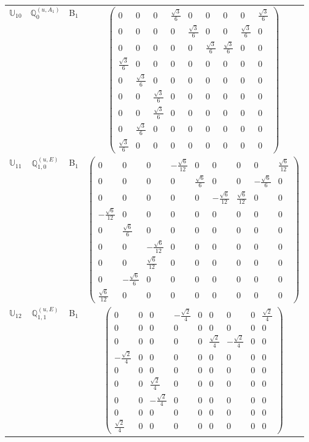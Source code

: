 \documentclass[fleqn,10pt,landscape]{article}
\begin{document}
\begin{itemize}
\begin{center}
\begin{longtable}{c|c|c|c}
$ \mathbb{U}_{10} $ & $\mathbb{Q}_{0}^{(u,A_{1})}$ & B$_{1}$ & $\begin{pmatrix} 0 & 0 & 0 & \frac{\sqrt{3}}{6} & 0 & 0 & 0 & 0 & \frac{\sqrt{3}}{6} \\ 0 & 0 & 0 & 0 & \frac{\sqrt{3}}{6} & 0 & 0 & \frac{\sqrt{3}}{6} & 0 \\ 0 & 0 & 0 & 0 & 0 & \frac{\sqrt{3}}{6} & \frac{\sqrt{3}}{6} & 0 & 0 \\ \frac{\sqrt{3}}{6} & 0 & 0 & 0 & 0 & 0 & 0 & 0 & 0 \\ 0 & \frac{\sqrt{3}}{6} & 0 & 0 & 0 & 0 & 0 & 0 & 0 \\ 0 & 0 & \frac{\sqrt{3}}{6} & 0 & 0 & 0 & 0 & 0 & 0 \\ 0 & 0 & \frac{\sqrt{3}}{6} & 0 & 0 & 0 & 0 & 0 & 0 \\ 0 & \frac{\sqrt{3}}{6} & 0 & 0 & 0 & 0 & 0 & 0 & 0 \\ \frac{\sqrt{3}}{6} & 0 & 0 & 0 & 0 & 0 & 0 & 0 & 0 \end{pmatrix}$ \\
$ \mathbb{U}_{11} $ & $\mathbb{Q}_{1,0}^{(u,E)}$ & B$_{1}$ & $\begin{pmatrix} 0 & 0 & 0 & - \frac{\sqrt{6}}{12} & 0 & 0 & 0 & 0 & \frac{\sqrt{6}}{12} \\ 0 & 0 & 0 & 0 & \frac{\sqrt{6}}{6} & 0 & 0 & - \frac{\sqrt{6}}{6} & 0 \\ 0 & 0 & 0 & 0 & 0 & - \frac{\sqrt{6}}{12} & \frac{\sqrt{6}}{12} & 0 & 0 \\ - \frac{\sqrt{6}}{12} & 0 & 0 & 0 & 0 & 0 & 0 & 0 & 0 \\ 0 & \frac{\sqrt{6}}{6} & 0 & 0 & 0 & 0 & 0 & 0 & 0 \\ 0 & 0 & - \frac{\sqrt{6}}{12} & 0 & 0 & 0 & 0 & 0 & 0 \\ 0 & 0 & \frac{\sqrt{6}}{12} & 0 & 0 & 0 & 0 & 0 & 0 \\ 0 & - \frac{\sqrt{6}}{6} & 0 & 0 & 0 & 0 & 0 & 0 & 0 \\ \frac{\sqrt{6}}{12} & 0 & 0 & 0 & 0 & 0 & 0 & 0 & 0 \end{pmatrix}$ \\
$ \mathbb{U}_{12} $ & $\mathbb{Q}_{1,1}^{(u,E)}$ & B$_{1}$ & $\begin{pmatrix} 0 & 0 & 0 & - \frac{\sqrt{2}}{4} & 0 & 0 & 0 & 0 & \frac{\sqrt{2}}{4} \\ 0 & 0 & 0 & 0 & 0 & 0 & 0 & 0 & 0 \\ 0 & 0 & 0 & 0 & 0 & \frac{\sqrt{2}}{4} & - \frac{\sqrt{2}}{4} & 0 & 0 \\ - \frac{\sqrt{2}}{4} & 0 & 0 & 0 & 0 & 0 & 0 & 0 & 0 \\ 0 & 0 & 0 & 0 & 0 & 0 & 0 & 0 & 0 \\ 0 & 0 & \frac{\sqrt{2}}{4} & 0 & 0 & 0 & 0 & 0 & 0 \\ 0 & 0 & - \frac{\sqrt{2}}{4} & 0 & 0 & 0 & 0 & 0 & 0 \\ 0 & 0 & 0 & 0 & 0 & 0 & 0 & 0 & 0 \\ \frac{\sqrt{2}}{4} & 0 & 0 & 0 & 0 & 0 & 0 & 0 & 0 \end{pmatrix}$ \\

\end{longtable}
\end{center}
\end{itemize}
\end{document}
